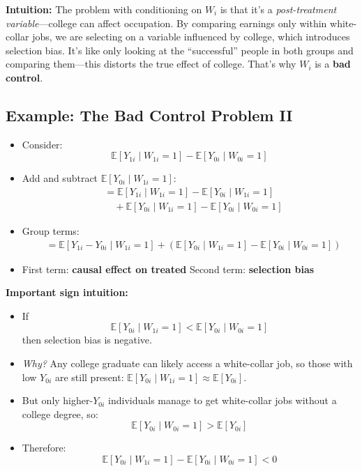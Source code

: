 \documentclass[12pt]{article}
\begin{document}
\textbf{Intuition:}  
The problem with conditioning on $W_i$ is that it's a \textit{post-treatment variable}—college can affect occupation. By comparing earnings only within white-collar jobs, we are selecting on a variable influenced by college, which introduces selection bias. It’s like only looking at the “successful” people in both groups and comparing them—this distorts the true effect of college. That’s why $W_i$ is a \textbf{bad control}.

\subsection*{\noindent\textbf{Example: The Bad Control Problem II}}

\begin{itemize}
  \item Consider:
  \[
  \mathbb{E}[Y_{1i} \mid W_{1i} = 1] - \mathbb{E}[Y_{0i} \mid W_{0i} = 1]
  \]

  \item Add and subtract $\mathbb{E}[Y_{0i} \mid W_{1i} = 1]$:
  \begin{align}
  &= \mathbb{E}[Y_{1i} \mid W_{1i} = 1] - \mathbb{E}[Y_{0i} \mid W_{1i} = 1] \\
  &\quad + \mathbb{E}[Y_{0i} \mid W_{1i} = 1] - \mathbb{E}[Y_{0i} \mid W_{0i} = 1]
  \end{align}

  \item Group terms:
  \begin{align}
  &= \mathbb{E}[Y_{1i} - Y_{0i} \mid W_{1i} = 1] + \left( \mathbb{E}[Y_{0i} \mid W_{1i} = 1] - \mathbb{E}[Y_{0i} \mid W_{0i} = 1] \right)
  \end{align}

  \item First term: \textbf{causal effect on treated}  
  Second term: \textbf{selection bias}
\end{itemize}

\vspace{0.5em}
\textbf{Important sign intuition:}
\begin{itemize}
  \item If
  \[
  \mathbb{E}[Y_{0i} \mid W_{1i} = 1] < \mathbb{E}[Y_{0i} \mid W_{0i} = 1]
  \]
  then selection bias is negative.

  \item \textit{Why?} Any college graduate can likely access a white-collar job, so those with low $Y_{0i}$ are still present: $\mathbb{E}[Y_{0i} \mid W_{1i} = 1] \approx \mathbb{E}[Y_{0i}]$.

  \item But only higher-$Y_{0i}$ individuals manage to get white-collar jobs without a college degree, so:  
  \[
  \mathbb{E}[Y_{0i} \mid W_{0i} = 1] > \mathbb{E}[Y_{0i}]
  \]

  \item Therefore:  
  \[
  \mathbb{E}[Y_{0i} \mid W_{1i} = 1] - \mathbb{E}[Y_{0i} \mid W_{0i} = 1] < 0
  \]
\end{itemize}
\end{document}
